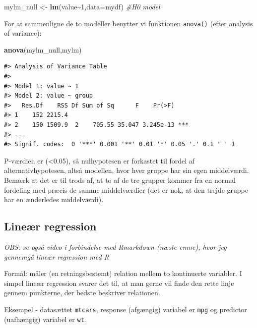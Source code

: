 \documentclass[
]{book}
\newenvironment{Shaded}{\begin{snugshade}}{\end{snugshade}}
\newcommand{\AttributeTok}[1]{\textcolor[rgb]{0.27,0.27,0.27}{#1}}
\newcommand{\CommentTok}[1]{\textcolor[rgb]{0.37,0.37,0.37}{\textit{#1}}}
\newcommand{\DecValTok}[1]{\textcolor[rgb]{0.06,0.06,0.06}{#1}}
\newcommand{\FunctionTok}[1]{\textcolor[rgb]{0.27,0.27,0.27}{\textbf{#1}}}
\newcommand{\NormalTok}[1]{#1}
\newcommand{\OtherTok}[1]{\textcolor[rgb]{0.37,0.37,0.37}{#1}}
\newcommand{\SpecialCharTok}[1]{\textcolor[rgb]{0.43,0.43,0.43}{\textbf{#1}}}
\begin{document}
\begin{Shaded}
\begin{Highlighting}[]
\NormalTok{mylm\_null }\OtherTok{\textless{}{-}} \FunctionTok{lm}\NormalTok{(value}\SpecialCharTok{\textasciitilde{}}\DecValTok{1}\NormalTok{,}\AttributeTok{data=}\NormalTok{mydf) }\CommentTok{\#H0 model}
\end{Highlighting}
\end{Shaded}

For at sammenligne de to modeller benytter vi funktionen \texttt{anova()} (efter analysis of variance):

\begin{Shaded}
\begin{Highlighting}[]
\FunctionTok{anova}\NormalTok{(mylm\_null,mylm)}
\end{Highlighting}
\end{Shaded}

\begin{verbatim}
#> Analysis of Variance Table
#> 
#> Model 1: value ~ 1
#> Model 2: value ~ group
#>   Res.Df    RSS Df Sum of Sq      F    Pr(>F)    
#> 1    152 2215.4                                  
#> 2    150 1509.9  2    705.55 35.047 3.245e-13 ***
#> ---
#> Signif. codes:  0 '***' 0.001 '**' 0.01 '*' 0.05 '.' 0.1 ' ' 1
\end{verbatim}

P-værdien er (\textless0.05), så nulhypotesen er forkastet til fordel af alternativhypotesen, altså modellen, hvor hver gruppe har sin egen middelværdi. Bemærk at det er til trods af, at to af de tre grupper kommer fra en normal fordeling med præcis de samme middelværdier (det er nok, at den trejde gruppe har en ænderledes middelværdi).

\subsection{Lineær regression}\label{lineuxe6r-regression}

\emph{OBS: se også video i forbindelse med Rmarkdown (næste emne), hvor jeg gennemgå lineær regression med R}

Formål: måler (en retningsbestemt) relation mellem to kontinuerte variabler. I simpel lineær regression svarer det til, at man gerne vil finde den rette linje gennem punkterne, der bedste beskriver relationen.

Eksempel - datasættet \texttt{mtcars}, response (afgængig) variabel er \texttt{mpg} og predictor (uafhængig) variabel er \texttt{wt}.
\end{document}
